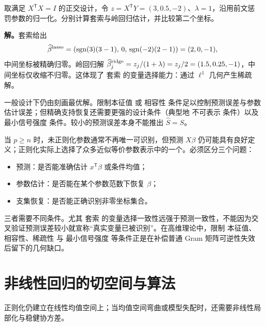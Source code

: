 \begin{workedexample}[岭收缩与套索归零]
取满足 $X^{\mathsf T}X=I$ 的正交设计，令 $z=X^{\mathsf T}Y=(3,0.5,-2)$、$\lambda=1$，沿用前文惩罚参数的归一化。分别计算套索与岭回归估计，并比较第二个坐标。

\textbf{解。}套索给出
\[
\widehat\beta^{\rm lasso}=(\operatorname{sgn}(3)(3-1),\,0,\,\operatorname{sgn}(-2)(2-1))=(2,0,-1),
\]
中间坐标被精确归零。岭回归解 $\widehat\beta^{\rm ridge}_j=z_j/(1+\lambda)=z_j/2=(1.5,0.25,-1)$，中间坐标仅收缩不归零。这体现了 套索 的变量选择能力：通过 $\ell^1$ 几何产生稀疏解。
\end{workedexample}

\begin{note}[预测、参数估计与支集恢复的不同条件]
一般设计下仍由刻画最优解。限制本征值 或 相容性 条件足以控制预测误差与参数估计误差；但精确支持恢复还需要更强的设计条件（典型地 不可表示 条件）以及 最小信号强度 条件。较小的预测误差本身不能推出 $\widehat S=S$。

当 $p\ge n$ 时，未正则化参数通常不再唯一可识别，但预测 $X\beta$ 仍可能具有良好定义；正则化实际上选择了众多近似等价参数表示中的一个。必须区分三个问题：
\begin{itemize}
\item 预测：是否能准确估计 $x^{\mathsf T}\beta$ 或条件均值；
\item 参数估计：是否能在某个参数范数下恢复 $\beta$；
\item 支集恢复：是否能正确识别非零坐标集合。
\end{itemize}
三者需要不同条件。尤其 套索 的变量选择一致性远强于预测一致性，不能因为交叉验证预测误差较小就宣称“真实变量已被识别”。在高维理论中，限制 本征值、相容性、稀疏性 与 最小信号强度 等条件正是在补偿普通 Gram 矩阵可逆性失效后留下的几何缺口。
\end{note}

\section{非线性回归的切空间与算法}

正则化仍建立在线性均值空间上；当均值空间弯曲或模型失配时，还需要非线性局部化与稳健协方差。

